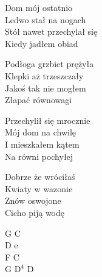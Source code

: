 \begin{text}
    Dom mój ostatnio\\
    Ledwo stał na nogach\\
    Stół nawet przechylał się\\
    Kiedy jadłem obiad

    Podłoga grzbiet prężyła\\
    Klepki aż trzeszczały\\
    Jakoś tak nie mogłem\\
    Złapać równowagi

    Przechylił się mrocznie\\
    Mój dom na chwilę\\
    I mieszkałem kątem\\
    Na równi pochyłej

    Dobrze że wróciłaś\\
    Kwiaty w wazonie\\
    Znów oswojone\\
    Cicho piją wodę
\end{text}
\begin{chord}
    G C\\
    D e\\
    F C\\
    G $\mathrm{D^{4}}$ D
\end{chord}
